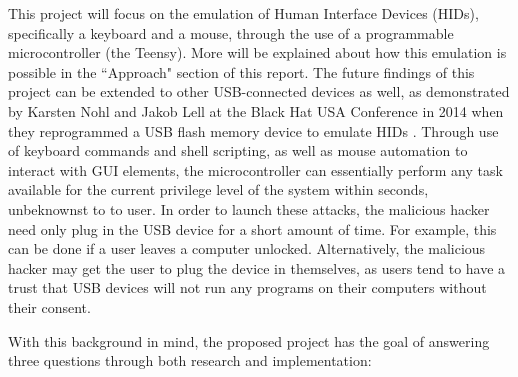 \documentclass[pagenumbers]{ieee}
\begin{document}
This project will focus on the emulation of Human Interface Devices (HIDs), specifically a keyboard and a mouse, through the use of a programmable microcontroller (the Teensy). More will be explained about how this emulation is possible in the ``Approach" section of this report. The future findings of this project can be extended to other USB-connected devices as well, as demonstrated by Karsten Nohl and Jakob Lell at the Black Hat USA Conference in 2014 when they reprogrammed a USB flash memory device to emulate HIDs \cite{nohl}. Through use of keyboard commands and shell scripting, as well as mouse automation to interact with GUI elements, the microcontroller can essentially perform any task available for the current privilege level of the system within seconds, unbeknownst to to user. In order to launch these attacks, the malicious hacker need only plug in the USB device for a short amount of time. For example, this can be done if a user leaves a computer unlocked. Alternatively, the malicious hacker may get the user to plug the device in themselves, as users tend to have a trust that USB devices will not run any programs on their computers without their consent.

With this background in mind, the proposed project has the goal of answering three questions through both research and implementation:
\end{document}
